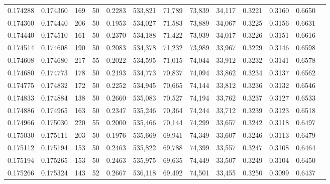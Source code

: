 \begin{tabular}{rrrrrrrrrrrrr}
0.174288 & 0.174360 &   169 &  50 &                                     0.2283 & 533,821 &  71,789 &  73,839 &  34,117 & 0.3221 & 0.3160 & 0.6650 \\
0.174360 & 0.174440 &   206 &  50 &                                     0.1953 & 534,027 &  71,583 &  73,889 &  34,067 & 0.3225 & 0.3156 & 0.6631 \\
0.174440 & 0.174510 &   161 &  50 &                                     0.2370 & 534,188 &  71,422 &  73,939 &  34,017 & 0.3226 & 0.3151 & 0.6616 \\
0.174514 & 0.174608 &   190 &  50 &                                     0.2083 & 534,378 &  71,232 &  73,989 &  33,967 & 0.3229 & 0.3146 & 0.6598 \\
0.174608 & 0.174680 &   217 &  55 &                                     0.2022 & 534,595 &  71,015 &  74,044 &  33,912 & 0.3232 & 0.3141 & 0.6578 \\
0.174680 & 0.174773 &   178 &  50 &                                     0.2193 & 534,773 &  70,837 &  74,094 &  33,862 & 0.3234 & 0.3137 & 0.6562 \\
0.174775 & 0.174832 &   172 &  50 &                                     0.2252 & 534,945 &  70,665 &  74,144 &  33,812 & 0.3236 & 0.3132 & 0.6546 \\
0.174833 & 0.174884 &   138 &  50 &                                     0.2660 & 535,083 &  70,527 &  74,194 &  33,762 & 0.3237 & 0.3127 & 0.6533 \\
0.174886 & 0.174965 &   163 &  50 &                                     0.2347 & 535,246 &  70,364 &  74,244 &  33,712 & 0.3239 & 0.3123 & 0.6518 \\
0.174966 & 0.175030 &   220 &  55 &                                     0.2000 & 535,466 &  70,144 &  74,299 &  33,657 & 0.3242 & 0.3118 & 0.6497 \\
0.175030 & 0.175111 &   203 &  50 &                                     0.1976 & 535,669 &  69,941 &  74,349 &  33,607 & 0.3246 & 0.3113 & 0.6479 \\
0.175112 & 0.175194 &   153 &  50 &                                     0.2463 & 535,822 &  69,788 &  74,399 &  33,557 & 0.3247 & 0.3108 & 0.6464 \\
0.175194 & 0.175265 &   153 &  50 &                                     0.2463 & 535,975 &  69,635 &  74,449 &  33,507 & 0.3249 & 0.3104 & 0.6450 \\
0.175266 & 0.175324 &   143 &  52 &                                     0.2667 & 536,118 &  69,492 &  74,501 &  33,455 & 0.3250 & 0.3099 & 0.6437 \\

\end{tabular}
